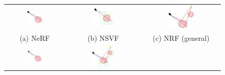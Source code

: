 \begin{figure}
\label{fig:samplings}
    \begin{tabular}{ccc}
          \includegraphics[width=0.285\textwidth]{figures/sampling_nerf.png}
          & \includegraphics[width=0.26\textwidth]{figures/sampling_nsvf.png}
          & \includegraphics[width=0.355\textwidth]{figures/sampling_nrf.png}
          \\(a) NeRF \cite{mildenhall2020nerf} & (b) NSVF \cite{liu2021neural} & (c) NRF \cite{bi2020neural} (general)
          \\[6pt]\includegraphics[width=0.26\textwidth]{figures/sampling_nrf_colocated.png}
          & \includegraphics[width=0.32\textwidth]{figures/sampling_bfex.png}

\end{tabular}
\end{figure}
